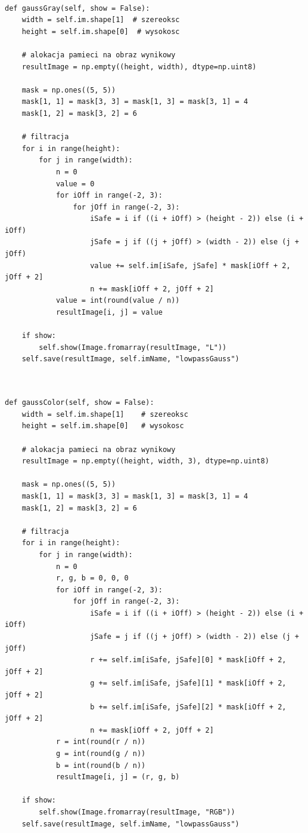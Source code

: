 \documentclass[final,a4paper,openany,12pt]{mwbk}
\begin{document}

\begin{lstlisting}[caption=Filtr dolnoprzepustowy Gaussowski (obraz szary)]
	
def gaussGray(self, show = False):
	width = self.im.shape[1]  # szereoksc
	height = self.im.shape[0]  # wysokosc
	
	# alokacja pamieci na obraz wynikowy
	resultImage = np.empty((height, width), dtype=np.uint8)
	
	mask = np.ones((5, 5))
	mask[1, 1] = mask[3, 3] = mask[1, 3] = mask[3, 1] = 4
	mask[1, 2] = mask[3, 2] = 6
	
	# filtracja
	for i in range(height):
		for j in range(width):
			n = 0
			value = 0
			for iOff in range(-2, 3):
				for jOff in range(-2, 3):
					iSafe = i if ((i + iOff) > (height - 2)) else (i + iOff)
					jSafe = j if ((j + jOff) > (width - 2)) else (j + jOff)
					value += self.im[iSafe, jSafe] * mask[iOff + 2, jOff + 2]
					n += mask[iOff + 2, jOff + 2]
			value = int(round(value / n))
			resultImage[i, j] = value
	
	if show:
		self.show(Image.fromarray(resultImage, "L"))
	self.save(resultImage, self.imName, "lowpassGauss")
	
\end{lstlisting}

\newpage


\begin{lstlisting}[caption=Filtr dolnoprzepustowy Gaussowski (obraz barwny)]

def gaussColor(self, show = False):
	width = self.im.shape[1]    # szereoksc
	height = self.im.shape[0]   # wysokosc
	
	# alokacja pamieci na obraz wynikowy
	resultImage = np.empty((height, width, 3), dtype=np.uint8)
	
	mask = np.ones((5, 5))
	mask[1, 1] = mask[3, 3] = mask[1, 3] = mask[3, 1] = 4
	mask[1, 2] = mask[3, 2] = 6

	# filtracja
	for i in range(height):
		for j in range(width):
			n = 0
			r, g, b = 0, 0, 0
			for iOff in range(-2, 3):
				for jOff in range(-2, 3):
					iSafe = i if ((i + iOff) > (height - 2)) else (i + iOff)
					jSafe = j if ((j + jOff) > (width - 2)) else (j + jOff)
					r += self.im[iSafe, jSafe][0] * mask[iOff + 2, jOff + 2]
					g += self.im[iSafe, jSafe][1] * mask[iOff + 2, jOff + 2]
					b += self.im[iSafe, jSafe][2] * mask[iOff + 2, jOff + 2]
					n += mask[iOff + 2, jOff + 2]
			r = int(round(r / n))
			g = int(round(g / n))
			b = int(round(b / n))
			resultImage[i, j] = (r, g, b)
	
	if show:
		self.show(Image.fromarray(resultImage, "RGB"))
	self.save(resultImage, self.imName, "lowpassGauss")

\end{lstlisting}
\end{document}
